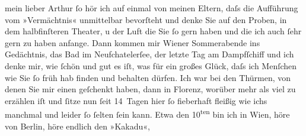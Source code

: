 \begin{ledgroupsized}[t]{13cm}
           \pstart{}mein lieber Arthur\pend\pstart
           ſo hör ich auf einmal von meinen Eltern, daſs die Aufführung vom »Vermächtnis« unmittelbar bevorſteht und denke Sie auf den Proben,
               in dem halbfinſteren Theater, u der Luft die Sie ſo gern haben und die ich auch ſehr
               gern zu haben anfange. Dann kommen mir Wiener
               Sommerabende ins Gedächtnis, das Bad im Neufchatelerſee, der letzte {\pb}Tag am Dampfſchiff und ich denke
               mir, wie ſchön und gut es iſt, was für ein großes Glück, daſs ich Menſchen wie Sie ſo
               früh hab finden und behalten dürfen.\pend
           \pstart
           Ich war bei den Thürmen, von
               denen Sie mir einen geſchenkt haben, dann in Florenz, worüber mehr als viel zu erzählen iſt und
               ſitze nun ſeit 14 Tagen hier ſo fieberhaft fleißig wie ichs manchmal und leider ſo
               ſelten ſein kann. Etwa den 10\textsuperscript{ten} bin ich in Wien, höre von Berlin, höre endlich den »Kakadu«,

\end{ledgroupsized}

